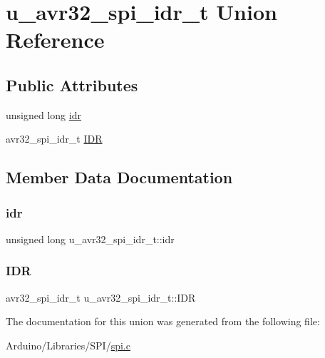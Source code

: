 \hypertarget{unionu__avr32__spi__idr__t}{}\section{u\+\_\+avr32\+\_\+spi\+\_\+idr\+\_\+t Union Reference}
\label{unionu__avr32__spi__idr__t}
\subsection*{Public Attributes}
\begin{DoxyCompactItemize}
\item 
unsigned long \hyperlink{unionu__avr32__spi__idr__t_a2d18e7136f65428cfb8b3f137371a799}{idr}
\item 
avr32\+\_\+spi\+\_\+idr\+\_\+t \hyperlink{unionu__avr32__spi__idr__t_a06ada7c165b785398d24060fc7585668}{I\+DR}
\end{DoxyCompactItemize}


\subsection{Member Data Documentation}
\mbox{\label{unionu__avr32__spi__idr__t_a2d18e7136f65428cfb8b3f137371a799}} 
\subsubsection{\texorpdfstring{idr}{idr}}
{\footnotesize\ttfamily unsigned long u\+\_\+avr32\+\_\+spi\+\_\+idr\+\_\+t\+::idr}

\mbox{\label{unionu__avr32__spi__idr__t_a06ada7c165b785398d24060fc7585668}} 
\subsubsection{\texorpdfstring{I\+DR}{IDR}}
{\footnotesize\ttfamily avr32\+\_\+spi\+\_\+idr\+\_\+t u\+\_\+avr32\+\_\+spi\+\_\+idr\+\_\+t\+::\+I\+DR}



The documentation for this union was generated from the following file\+:\begin{DoxyCompactItemize}
\item 
Arduino/\+Libraries/\+S\+P\+I/\hyperlink{spi_8c}{spi.\+c}\end{DoxyCompactItemize}
